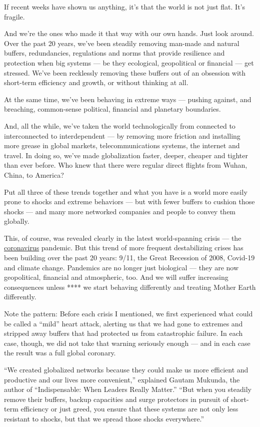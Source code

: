 If recent weeks have shown us anything, it's that the world is not just
flat. It's fragile.

And we're the ones who made it that way with our own hands. Just look
around. Over the past 20 years, we've been steadily removing man-made
and natural buffers, redundancies, regulations and norms that provide
resilience and protection when big systems --- be they ecological,
geopolitical or financial --- get stressed. We've been recklessly
removing these buffers out of an obsession with short-term efficiency
and growth, or without thinking at all.

At the same time, we've been behaving in extreme ways --- pushing
against, and breaching, common-sense political, financial and planetary
boundaries.

And, all the while, we've taken the world technologically from connected
to interconnected to interdependent --- by removing more friction and
installing more grease in global markets, telecommunications systems,
the internet and travel. In doing so, we've made globalization faster,
deeper, cheaper and tighter than ever before. Who knew that there were
regular direct flights from Wuhan, China, to America?

Put all three of these trends together and what you have is a world more
easily prone to shocks and extreme behaviors --- but with fewer buffers
to cushion those shocks --- and many more networked companies and people
to convey them globally.

This, of course, was revealed clearly in the latest world-spanning
crisis --- the
\href{https://www.nytimes.com/2020/06/01/health/coronavirus-mysteries.html}{coronavirus}
pandemic. But this trend of more frequent destabilizing crises has been
building over the past 20 years: 9/11, the Great Recession of 2008,
Covid-19 and climate change. Pandemics are no longer just biological ---
they are now geopolitical, financial and atmospheric, too. And we will
suffer increasing consequences unless **** we start behaving differently
and treating Mother Earth differently.

Note the pattern: Before each crisis I mentioned, we first experienced
what could be called a ``mild'' heart attack, alerting us that we had
gone to extremes and stripped away buffers that had protected us from
catastrophic failure. In each case, though, we did not take that warning
seriously enough --- and in each case the result was a full global
coronary.

``We created globalized networks because they could make us more
efficient and productive and our lives more convenient,'' explained
Gautam Mukunda, the author of ``Indispensable: When Leaders Really
Matter.'' ``But when you steadily remove their buffers, backup
capacities and surge protectors in pursuit of short-term efficiency or
just greed, you ensure that these systems are not only less resistant to
shocks, but that we spread those shocks everywhere.''

